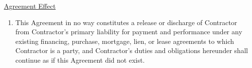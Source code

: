 \underline{Agreement Effect}
\begin{enumerate}[
    ref = \SecondLevelEnumerator
]
    \item This Agreement in no way constitutes a release or discharge of
    Contractor from Contractor's primary liability for payment and
    performance under any existing financing, purchase, mortgage, lien, or
    lease agreements to which Contractor is a party, and Contractor's
    duties and obligations hereunder shall continue as if this Agreement
    did not exist.
\end{enumerate}